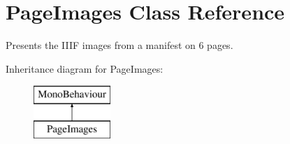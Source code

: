\section{Page\+Images Class Reference}
\label{class_page_images}


Presents the I\+I\+IF images from a manifest on 6 pages.  


Inheritance diagram for Page\+Images\+:\begin{figure}[H]
\begin{center}
\leavevmode
\includegraphics[height=2.000000cm]{class_page_images}
\end{center}
\end{figure}
